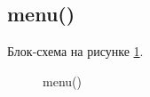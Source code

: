 \subsection{menu()}

Блок-схема на рисунке \ref{fig:menu}.

\begin{figure}[p]
    \caption{menu()}
    \label{fig:menu}
\end{figure}





\newpage
